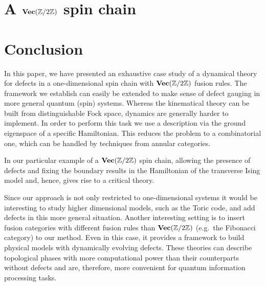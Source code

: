 %






\section{A $\textbf{Vec}(\mathbb{Z}/2\mathbb{Z})$ spin chain}





\section{Conclusion}\label{Conclusion}
In this paper, we have presented an exhaustive case study of a dynamical theory for defects in a one-dimensional spin chain with $\textbf{Vec}(\mathbb{Z}/2\mathbb{Z})$ fusion rules. The framework we establish can easily be extended to make sense of defect gauging in more general quantum (spin) systems. Whereas the kinematical theory can be built from distinguishable Fock space, dynamics are generally harder to implement. In order to perform this task we use a description via the ground eigenspace of a specific Hamiltonian. This reduces the problem to a combinatorial one, which can be handled by techniques from annular categories.

In our particular example of a $\textbf{Vec}(\mathbb{Z}/2\mathbb{Z})$ spin chain, allowing the presence of defects and fixing the boundary results in the Hamiltonian of the transverse Ising model and, hence, gives rise to a critical theory.

Since our approach is not only restricted to one-dimensional systems it would be interesting to study higher dimensional models, such as the Toric code, and add defects in this more general situation. Another interesting setting is to insert fusion categories with different fusion rules than $\textbf{Vec}(\mathbb{Z}/2\mathbb{Z})$ (e.g.\ the Fibonacci category) to our method. Even in this case, it provides a framework to build physical models with dynamically evolving defects. These theories can describe topological phases with more computational power than their counterparts without defects and are, therefore, more convenient for quantum information processing tasks.





%



%
